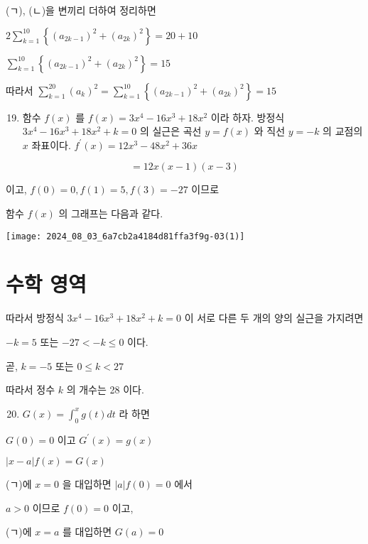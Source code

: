 \documentclass[10pt]{article}
\begin{document}
(ㄱ), (ㄴ)을 변끼리 더하여 정리하면

\(2 \sum_{k=1}^{10}\left\{\left(a_{2 k-1}\right)^{2}+\left(a_{2 k}\right)^{2}\right\}=20+10\)

\(\sum_{k=1}^{10}\left\{\left(a_{2 k-1}\right)^{2}+\left(a_{2 k}\right)^{2}\right\}=15\)

따라서 \(\sum_{k=1}^{20}\left(a_{k}\right)^{2}=\sum_{k=1}^{10}\left\{\left(a_{2 k-1}\right)^{2}+\left(a_{2 k}\right)^{2}\right\}=15\)

\begin{enumerate}
  \setcounter{enumi}{18}
  \item 함수 \(f(x)\) 를 \(f(x)=3 x^{4}-16 x^{3}+18 x^{2}\) 이라 하자. 방정식 \(3 x^{4}-16 x^{3}+18 x^{2}+k=0\) 의 실근은 곡선 \(y=f(x)\) 와 직선 \(y=-k\) 의 교점의 \(x\) 좌표이다. \(f^{\prime}(x)=12 x^{3}-48 x^{2}+36 x\)
\end{enumerate}

\[
=12 x(x-1)(x-3)
\]

이고, \(f(0)=0, f(1)=5, f(3)=-27\) 이므로

함수 \(f(x)\) 의 그래프는 다음과 같다.

\begin{center}
\texttt{[image: 2024\_08\_03\_6a7cb2a4184d81ffa3f9g-03(1)]}
\end{center}

\section*{수학 영역}
따라서 방정식 \(3 x^{4}-16 x^{3}+18 x^{2}+k=0\) 이 서로 다른 두 개의 양의 실근을 가지려면

\(-k=5\) 또는 \(-27<-k \leq 0\) 이다.

곧, \(k=-5\) 또는 \(0 \leq k<27\)

따라서 정수 \(k\) 의 개수는 28 이다.

\begin{enumerate}
  \setcounter{enumi}{19}
  \item \(G(x)=\int_{0}^{x} g(t) d t\) 라 하면
\end{enumerate}

\(G(0)=0\) 이고 \(G^{\prime}(x)=g(x)\)

\(|x-a| f(x)=G(x)\)

(ㄱ)에 \(x=0\) 을 대입하면 \(|a| f(0)=0\) 에서

\(a>0\) 이므로 \(f(0)=0\) 이고,

(ㄱ)에 \(x=a\) 를 대입하면 \(G(a)=0\)
\end{document}
